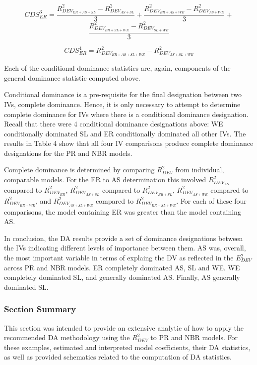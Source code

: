 \documentclass[ShortAfour,times,sageapa]{sagej}
\begin{document}
	$$CDS^3_{ER} = \frac{R^2_{DEV_{ER + AS + SL}} - R^2_{DEV_{AS + SL}}}{3} + \frac{R^2_{DEV_{ER + AS + WE}} - R^2_{DEV_{AS + WE}}}{3} + $$
	$$\frac{R^2_{DEV_{ER + SL + WE}} - R^2_{DEV_{SL + WE}}}{3}$$
	
	$$CDS^4_{ER} = R^2_{DEV_{ER + AS + SL + WE}} - R^2_{DEV_{AS + SL + WE}}$$
	
	Each of the conditional dominance statistics are, again, components of the general dominance statistic computed above.
	
	Conditional dominance is a pre-requisite for the final designation between two IVs, complete dominance.
	Hence, it is only necessary to attempt to determine complete dominance for IVs where there is a conditional dominance designation.
	Recall that there were 4 conditional dominance designations above: WE conditionally dominated SL and ER conditionally dominated all other IVs. 
	The results in Table 4 show that all four IV comparisons produce complete dominance designations for the PR and NBR models.
	
	Complete dominance is determined by comparing $R^2_{DEV}$ from individual, comparable models.
	For the ER to AS determination this involved $R^2_{DEV_{AS}}$ compared to $R^2_{DEV_{ER}}$, $R^2_{DEV_{AS + SL}}$ compared to $R^2_{DEV_{ER + SL}}$, $R^2_{DEV_{AS + WE}}$ compared to $R^2_{DEV_{ER + WE}}$, and $R^2_{DEV_{AS + SL + WE}}$ compared to $R^2_{DEV_{ER + SL + WE}}$.
	For each of these four comparisons, the model containing ER was greater than the model containing AS.
	
	In conclusion, the DA results provide a set of dominance designations between the IVs indicating different levels of importance between them. 
	AS was, overall, the most important variable in terms of explaing the DV as reflected in the $E^2_{DEV}$ across PR and NBR models. 
	ER completely dominated AS, SL and WE.
	WE completely dominated SL, and generally dominated AS.
	Finally, AS generally dominated SL.

	\subsubsection{Section Summary}
	
	This section was intended to provide an extensive analytic of how to apply the recommended DA methodology using the $R^2_{DEV}$ to PR and NBR models.
	For these examples, estimated and interpreted model coefficients, their DA statistics, as well as provided schematics related to the computation of DA statistics.
	
\end{document}
